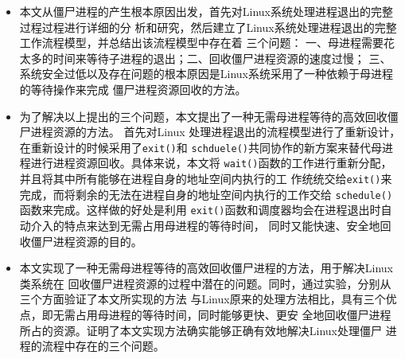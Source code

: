 \documentclass{swfuthesism}
\begin{document}
\begin{itemize}
\item 本文从僵尸进程的产生根本原因出发，首先对Linux系统处理进程退出的完整过程过程进行详细的分
  析和研究，然后建立了Linux系统处理进程退出的完整工作流程模型，并总结出该流程模型中存在着
  三个问题： 一、母进程需要花太多的时间来等待子进程的退出；二、回收僵尸进程资源的速度过慢；
  三、系统安全过低以及存在问题的根本原因是Linux系统采用了一种依赖于母进程的等待操作来完成
  僵尸进程资源回收的方法。 
  
\item 为了解决以上提出的三个问题，本文提出了一种无需母进程等待的高效回收僵尸进程资源的方法。
  首先对Linux 处理进程退出的流程模型进行了重新设计，在重新设计的时候采用了\texttt{exit()}和
  \texttt{schduele()}共同协作的新方案来替代母进程进行进程资源回收。具体来说，本文将
  \texttt{wait()}函数的工作进行重新分配，并且将其中所有能够在进程自身的地址空间内执行的工
  作统统交给\texttt{exit()}来完成，而将剩余的无法在进程自身的地址空间内执行的工作交给
  \texttt{schedule()}函数来完成。这样做的好处是利用
  \texttt{exit()}函数和调度器均会在进程退出时自动介入的特点来达到无需占用母进程的等待时间，
  同时又能快速、安全地回收僵尸进程资源的目的。
  
\item 本文实现了一种无需母进程等待的高效回收僵尸进程的方法，用于解决Linux类系统在
  回收僵尸进程资源的过程中潜在的问题。同时，通过实验，分别从三个方面验证了本文所实现的方法
  与Linux原来的处理方法相比，具有三个优点，即无需占用母进程的等待时间，同时能够更快、更安
  全地回收僵尸进程所占的资源。证明了本文实现方法确实能够正确有效地解决Linux处理僵尸
  进程的流程中存在的三个问题。
  

\end{itemize}
\end{document}
